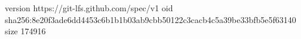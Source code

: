 version https://git-lfs.github.com/spec/v1
oid sha256:8e20f3ade6dd4453c6b1b1b03ab9cbb50122c3cacb4c5a39be33bfb5e5f63140
size 174916
